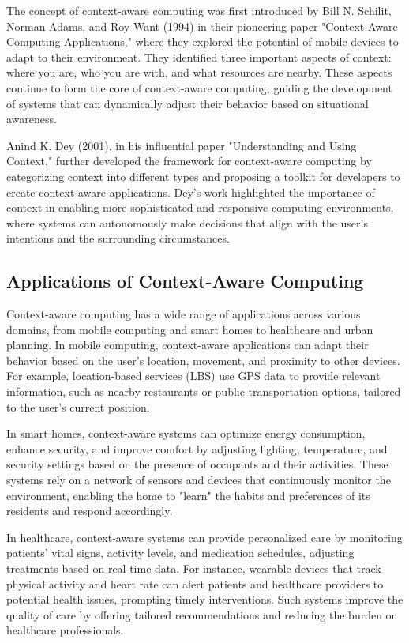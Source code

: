 \documentclass[12pt,twoside]{article}
\begin{document}
The concept of context-aware computing was first introduced by Bill N. Schilit, Norman Adams, and Roy Want (1994) in their pioneering paper "Context-Aware Computing Applications," where they explored the potential of mobile devices to adapt to their environment. They identified three important aspects of context: where you are, who you are with, and what resources are nearby. These aspects continue to form the core of context-aware computing, guiding the development of systems that can dynamically adjust their behavior based on situational awareness.

Anind K. Dey (2001), in his influential paper "Understanding and Using Context," further developed the framework for context-aware computing by categorizing context into different types and proposing a toolkit for developers to create context-aware applications. Dey's work highlighted the importance of context in enabling more sophisticated and responsive computing environments, where systems can autonomously make decisions that align with the user's intentions and the surrounding circumstances.

\subsection{Applications of Context-Aware Computing}

Context-aware computing has a wide range of applications across various domains, from mobile computing and smart homes to healthcare and urban planning. In mobile computing, context-aware applications can adapt their behavior based on the user's location, movement, and proximity to other devices. For example, location-based services (LBS) use GPS data to provide relevant information, such as nearby restaurants or public transportation options, tailored to the user's current position.

In smart homes, context-aware systems can optimize energy consumption, enhance security, and improve comfort by adjusting lighting, temperature, and security settings based on the presence of occupants and their activities. These systems rely on a network of sensors and devices that continuously monitor the environment, enabling the home to "learn" the habits and preferences of its residents and respond accordingly.

In healthcare, context-aware systems can provide personalized care by monitoring patients' vital signs, activity levels, and medication schedules, adjusting treatments based on real-time data. For instance, wearable devices that track physical activity and heart rate can alert patients and healthcare providers to potential health issues, prompting timely interventions. Such systems improve the quality of care by offering tailored recommendations and reducing the burden on healthcare professionals.
\end{document}
